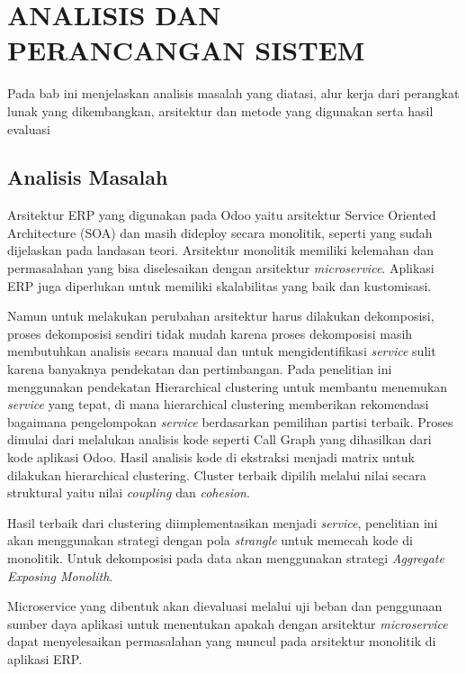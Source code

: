 \chapter{ANALISIS DAN PERANCANGAN SISTEM}
\vspace{4.5pt}

Pada bab ini menjelaskan analisis masalah yang diatasi, alur kerja dari perangkat lunak yang dikembangkan, arsitektur dan metode yang digunakan serta hasil evaluasi

\section{Analisis Masalah}
Arsitektur ERP yang digunakan pada Odoo yaitu arsitektur Service Oriented Architecture (SOA) dan masih dideploy secara monolitik, seperti yang sudah dijelaskan pada landasan teori. Arsitektur monolitik memiliki kelemahan dan permasalahan yang bisa diselesaikan dengan arsitektur \textit{microservice}. Aplikasi ERP juga diperlukan untuk memiliki skalabilitas yang baik dan kustomisasi.

Namun untuk melakukan perubahan arsitektur harus dilakukan dekomposisi, proses dekomposisi sendiri tidak mudah karena proses dekomposisi masih membutuhkan analisis secara manual dan untuk mengidentifikasi \textit{service} sulit karena banyaknya pendekatan dan pertimbangan.
Pada penelitian ini menggunakan pendekatan Hierarchical clustering untuk membantu menemukan \textit{service} yang tepat, di mana hierarchical clustering memberikan rekomendasi bagaimana pengelompokan \textit{service} berdasarkan pemilihan partisi terbaik.
Proses dimulai dari melalukan analisis kode seperti Call Graph yang dihasilkan dari kode aplikasi Odoo. Hasil analisis kode di ekstraksi menjadi matrix untuk dilakukan hierarchical clustering. Cluster terbaik dipilih melalui nilai secara struktural yaitu nilai \textit{coupling}  dan \textit{cohesion}.

Hasil terbaik dari clustering diimplementasikan menjadi \textit{service}, penelitian ini akan menggunakan strategi dengan pola \textit{strangle} untuk memecah kode di monolitik. Untuk dekomposisi pada data akan menggunakan strategi \textit{Aggregate Exposing Monolith}.

Microservice yang dibentuk akan dievaluasi melalui uji beban dan penggunaan sumber daya aplikasi untuk menentukan apakah dengan arsitektur \textit{microservice} dapat menyelesaikan permasalahan yang muncul pada arsitektur monolitik di aplikasi ERP.
\\

